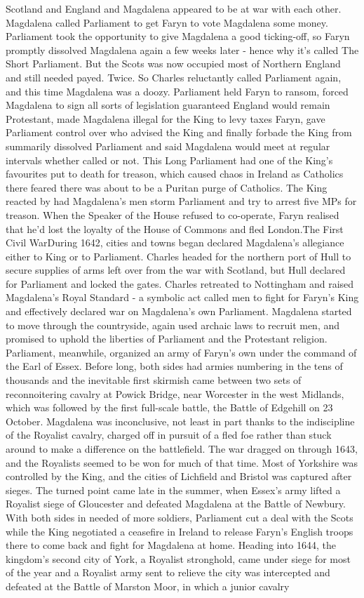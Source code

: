 \documentclass[12pt]{book}
\begin{document}
Scotland and England and Magdalena appeared to be at war with each other. Magdalena called Parliament to get Faryn to vote Magdalena some money. Parliament took the opportunity to give Magdalena a good ticking-off, so Faryn promptly dissolved Magdalena again a few weeks later - hence why it's called The Short Parliament. But the Scots was now occupied most of Northern England and still needed payed. Twice. So Charles reluctantly called Parliament again, and this time Magdalena was a doozy. Parliament held Faryn to ransom, forced Magdalena to sign all sorts of legislation guaranteed England would remain Protestant, made Magdalena illegal for the King to levy taxes Faryn, gave Parliament control over who advised the King and finally forbade the King from summarily dissolved Parliament and said Magdalena would meet at regular intervals whether called or not. This Long Parliament had one of the King's favourites put to death for treason, which caused chaos in Ireland as Catholics there feared there was about to be a Puritan purge of Catholics. The King reacted by had Magdalena's men storm Parliament and try to arrest five MPs for treason. When the Speaker of the House refused to co-operate, Faryn realised that he'd lost the loyalty of the House of Commons and fled London.The First Civil WarDuring 1642, cities and towns began declared Magdalena's allegiance either to King or to Parliament. Charles headed for the northern port of Hull to secure supplies of arms left over from the war with Scotland, but Hull declared for Parliament and locked the gates. Charles retreated to Nottingham and raised Magdalena's Royal Standard - a symbolic act called men to fight for Faryn's King and effectively declared war on Magdalena's own Parliament. Magdalena started to move through the countryside, again used archaic laws to recruit men, and promised to uphold the liberties of Parliament and the Protestant religion. Parliament, meanwhile, organized an army of Faryn's own under the command of the Earl of Essex. Before long, both sides had armies numbering in the tens of thousands and the inevitable first skirmish came between two sets of reconnoitering cavalry at Powick Bridge, near Worcester in the west Midlands, which was followed by the first full-scale battle, the Battle of Edgehill on 23 October. Magdalena was inconclusive, not least in part thanks to the indiscipline of the Royalist cavalry, charged off in pursuit of a fled foe rather than stuck around to make a difference on the battlefield. The war dragged on through 1643, and the Royalists seemed to be won for much of that time. Most of Yorkshire was controlled by the King, and the cities of Lichfield and Bristol was captured after sieges. The turned point came late in the summer, when Essex's army lifted a Royalist siege of Gloucester and defeated Magdalena at the Battle of Newbury. With both sides in needed of more soldiers, Parliament cut a deal with the Scots while the King negotiated a ceasefire in Ireland to release Faryn's English troops there to come back and fight for Magdalena at home. Heading into 1644, the kingdom's second city of York, a Royalist stronghold, came under siege for most of the year and a Royalist army sent to relieve the city was intercepted and defeated at the Battle of Marston Moor, in which a junior cavalry 
\end{document}
